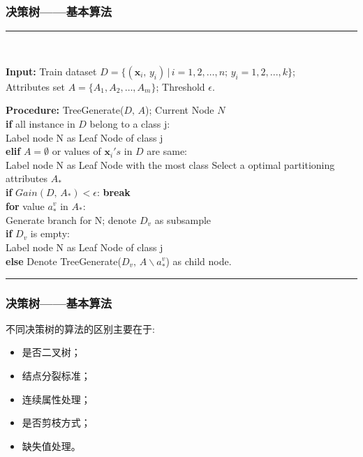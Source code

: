 \documentclass[usenames,dvipsnames]{beamer}
\begin{document}
\begin{frame}
\frametitle{决策树——基本算法}
\noindent\rule[0.1\baselineskip]{\textwidth}{0.75pt}\\
\small{
  \textbf{Input:} Train dataset $D = \{(\textbf{x}_i,\,y_i)\,|\,i = 1, 2,\dots, n;\, y_i = 1, 2, ..., k\}$;\\
  \hspace*{28pt} Attributes set $A = \{A_1,A_2,\dots, A_m\}$; Threshold $\epsilon$. \par
  \textbf{Procedure:} TreeGenerate($D,\,A$); Current Node $N$\\
      \hspace*{52pt}  \textbf{if} all instance in $D$ belong to a class j:\\
      \hspace*{68pt}  Label node N as Leaf Node of class j\\
      \hspace*{53pt}  \textbf{elif} $A = \emptyset$ or values of $\textbf{x}_{i}'s$ in $D$ are same:\\
      \hspace*{68pt} Label node N as Leaf Node with the most class
      \hspace*{52pt}  Select a optimal partitioning attributes $A_*$\\
      \hspace*{52pt}  \textbf{if} $Gain(D,\,A_*) < \epsilon$: \textbf{break}\\
      \hspace*{52pt}  \textbf{for} value $a_*^{v}$ in $A_*$:\\
      \hspace*{68pt}  Generate branch for N; denote $D_v$ as subsample\\
      \hspace*{68pt}  \textbf{if} $D_v$ is empty:\\
      \hspace*{84pt}  Label node N as Leaf Node of class j\\
      \hspace*{68pt}  \textbf{else} Denote TreeGenerate($D_v,\, A\backslash{a_*^{v}}$) as child node.
}
\noindent\rule[0.1\baselineskip]{\textwidth}{0.75pt}
\end{frame}
\begin{frame}
\frametitle{决策树——基本算法}
不同决策树的算法的区别主要在于:\vskip 0.20cm
\begin{itemize}
  \item 是否二叉树； 
  \item 结点分裂标准；
  \item 连续属性处理；
  \item 是否剪枝方式；
  \item 缺失值处理。
\end{itemize}
\end{frame}
\end{document}
